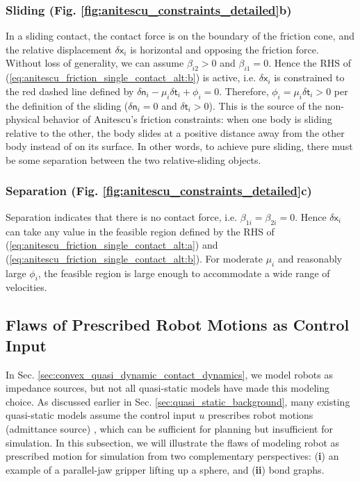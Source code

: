 \subsubsection{Sliding (Fig. \ref{fig:anitescu_constraints_detailed}b) \label{section:anitescu_friction_sliding}} In a sliding contact, the contact force is on the boundary of the friction cone, and the relative displacement $\delta \mathsf{x}_i$ is horizontal and opposing the friction force. Without loss of generality, we can assume $\beta_{i2}>0$ and $\beta_{i1} = 0$. Hence the RHS of (\ref{eq:anitescu_friction_single_contact_alt:b}) is active, i.e. $\delta \mathsf{x}_i$ is constrained to the red dashed line defined by $ \delta \mathsf{n}_i - \mu_i \delta \mathsf{t}_i + \phi_i = 0$. 
Therefore, $\phi_i = \mu_i \delta \mathsf{t}_i > 0$ per the definition of the sliding ($\delta \mathsf{n}_i = 0$ and $\delta \mathsf{t}_i > 0$).
This is the source of the non-physical behavior of Anitescu's friction constraints: when one body is sliding relative to the other, the body slides at a positive distance away from the other body instead of on its surface. In other words, to achieve pure sliding, there must be some separation between the two relative-sliding objects.

\subsubsection{Separation (Fig. \ref{fig:anitescu_constraints_detailed}c)} Separation indicates that there is no contact force, i.e. $\beta_{1i} = \beta_{2i} = 0$. Hence $\delta \mathsf{x}_i$ can take any value in the feasible region defined by the RHS of (\ref{eq:anitescu_friction_single_contact_alt:a}) and (\ref{eq:anitescu_friction_single_contact_alt:b}). For moderate $\mu_i$ and reasonably large $\phi_i$, the feasible region is large enough to accommodate a wide range of velocities.


\subsection{Flaws of Prescribed Robot Motions as Control Input} \label{sec:quasi_static:prescribed_motion_bad}
In Sec. \ref{sec:convex_quasi_dynamic_contact_dynamics}, we model robots as impedance sources, but not all quasi-static models have made this modeling choice. As discussed earlier in Sec. \ref{sec:quasi_static_background}, many existing quasi-static models assume the control input $u$ prescribes robot motions (admittance source) \cite{mason1986mechanics, lynch1996stable, zhou2017fast, hogan2020feedback}, which can be sufficient for planning but insufficient for simulation.
In this subsection, we will illustrate the flaws of modeling robot as prescribed motion for simulation from two complementary perspectives: (\textbf{i}) an example of a parallel-jaw gripper lifting up a sphere, and (\textbf{ii}) bond graphs.

